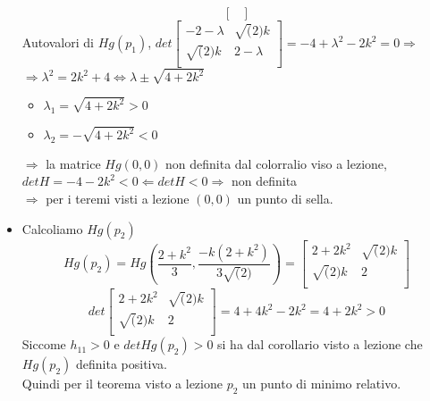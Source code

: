 \begin{eexercise}[Es. 3, Provetta]
\begin{itemize}
$$\begin{bmatrix}
      \end{bmatrix}$$
      Autovalori di $H g(p_1)$, $det\begin{bmatrix}
        -2-\lambda & \sqrt(2)k \\
        \sqrt(2)k & 2 -\lambda \\
      \end{bmatrix} = -4 + \lambda^2 - 2k^2 = 0 \Rightarrow$ \\
      $\Rightarrow \lambda^2 = 2k^2 + 4 \iff \lambda \pm \sqrt{4+2k^2}$
      \begin{itemize}
        \item $\lambda_1 = \sqrt{4+2k^2} > 0$ 
        \item $\lambda_2 = -\sqrt{4+2k^2} < 0$
      \end{itemize}
      $\Rightarrow$ la matrice $H g(0,0)$ non \ace definita dal colorralio viso a lezione, \\
      $detH = -4 - 2k^2 < 0 \Leftarrow detH < 0 \Rightarrow$ non definita \\
      $\Rightarrow$ per i teremi visti a lezione $(0,0)$ \ace un punto di sella. 
    \item Calcoliamo $H g(p_2)$
    $$Hg(p_2) = H g\left(\frac{2+k^2}{3}, \frac{-k(2+k^2)}{3\sqrt(2)} \right) = \begin{bmatrix}
      2+2k^2 & \sqrt(2)k \\
      \sqrt(2)k & 2 \\
    \end{bmatrix}$$
    $$det\begin{bmatrix}
      2+2k^2 & \sqrt(2)k \\
      \sqrt(2)k & 2 \\
    \end{bmatrix} = 4 +4k^2 - 2k^2 = 4+2k^2 > 0$$
    Siccome $h_{11} > 0$ e $detH g(p_2) > 0$ si ha dal corollario visto a lezione che 
    $H g(p_2)$ \ace definita positiva. \\
    Quindi per il teorema visto a lezione $p_2$ \ace un punto di minimo relativo.
  \end{itemize}
\end{eexercise}

